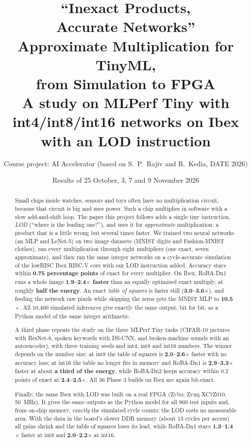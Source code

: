 \documentclass[11pt,a4paper]{article}
\title{\Huge\bfseries ``Inexact Products,\\ Accurate Networks''\\[0.5em]
\LARGE Approximate Multiplication for TinyML,\\ from Simulation to FPGA\\[0.8em]
\Large\mdseries A study on MLPerf Tiny with int4/int8/int16 networks on Ibex with an LOD instruction}
\author{Course project: AI Accelerator (based on S.~P.~Rajiv and R.~Kedia, DATE 2026)}
\date{Results of 25 October, 3, 7 and 9 November 2026}
\begin{document}
\maketitle

\begin{abstract}
\noindent Small chips inside watches, sensors and toys often have no multiplication circuit,
because that circuit is big and uses power. Such a chip multiplies in software with a slow
add-and-shift loop. The paper this project follows adds a single tiny instruction, \emph{LOD}
(``where is the leading one?''), and uses it for \emph{approximate} multiplication: a product
that is a little wrong but several times faster. We trained two neural networks (an MLP and
LeNet-5) on two image datasets (MNIST digits and Fashion-MNIST clothes), ran every
multiplication through eight multipliers (one exact, seven approximate), and then ran the same
integer networks on a cycle-accurate simulation of the lowRISC Ibex RISC-V core with our LOD
instruction added. Accuracy stays within \textbf{0.75 percentage points} of exact for every
multiplier. On Ibex, RoBA-Dn1 runs a whole image \textbf{1.9--2.4$\times$ faster} than an equally
optimised exact multiply, at roughly \textbf{half the energy}. An exact \emph{table of squares}
is faster still (\textbf{3.0--3.6$\times$}), and feeding the network raw pixels while skipping the
zeros gets the MNIST MLP to \textbf{10.5$\times$}. All 10{,}400 simulated inferences give exactly
the same output, bit for bit, as a Python model of the same integer arithmetic.

\noindent A third phase repeats the study on the three MLPerf Tiny tasks (CIFAR-10 pictures with ResNet-8,
spoken keywords with DS-CNN, and broken-machine sounds with an autoencoder), with three training seeds and
int4, int8 and int16 numbers. The winner depends on the number size: at int8 the table of squares is
\textbf{2.0--2.6$\times$} faster with no accuracy loss; at int16 the table no longer fits in memory and
RoBA-Dn1 is \textbf{2.9--3.3$\times$} faster at about \textbf{a third of the energy}, while RoBA-Dn2 keeps
accuracy within 0.2 points of exact at \textbf{2.4--2.5$\times$}. All 36 Phase 3 builds on Ibex are again
bit-exact.

\noindent Finally, the same Ibex with LOD was built on a real FPGA (Zybo, Zynq XC7Z010, 50~MHz). It gives the
same outputs as the Python model for all 960 test inputs and, from on-chip memory, \emph{exactly} the simulated
cycle counts; the LOD costs no measurable area. With the data in the board's slower DDR memory (about 15 cycles
per access) all gains shrink and the table of squares loses its lead, while RoBA-Dn1 stays
\textbf{1.3--1.4$\times$} faster at int8 and \textbf{2.0--2.2$\times$} at int16.
\end{abstract}

\tableofcontents
\newpage











\appendix

\end{document}
